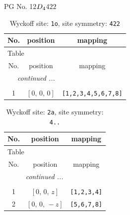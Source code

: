 \documentclass[fleqn,8pt]{jsarticle}
\begin{document}
\setcounter{MaxMatrixCols}{32}

\renewcommand{\tablename}{Table~}
\renewcommand{\figurename}{Figure~}
\begin{center}
\LARGE
PG No. 12\quad$D_{\rm 4}$\quad$422$\quad[ tetragonal ]
\end{center}
\renewcommand{\arraystretch}{1.2}
\begin{longtable}{ccc}
\caption{Wyckoff site: {\tt 1o}, site symmetry: {\tt 422}}
 \\
 \hline \hline
No. & position & mapping \\ \hline \endfirsthead

\multicolumn{2}{l}{\tablename\ \thetable{}} \\
 \hline \hline
No. & position & mapping \\ \hline \endhead

 \hline \hline
\multicolumn{2}{r}{\footnotesize\it continued ...} \\ \endfoot

 \hline \hline
\multicolumn{2}{r}{} \\ \endlastfoot

1 & $\left[ 0,\, 0,\, 0 \right]$ & {\tt [1,2,3,4,5,6,7,8]} \\
\end{longtable}
\renewcommand{\arraystretch}{1.2}
\begin{longtable}{ccc}
\caption{Wyckoff site: {\tt 2a}, site symmetry: {\tt 4..}}
 \\
 \hline \hline
No. & position & mapping \\ \hline \endfirsthead

\multicolumn{2}{l}{\tablename\ \thetable{}} \\
 \hline \hline
No. & position & mapping \\ \hline \endhead

 \hline \hline
\multicolumn{2}{r}{\footnotesize\it continued ...} \\ \endfoot

 \hline \hline
\multicolumn{2}{r}{} \\ \endlastfoot

1 & $\left[ 0,\, 0,\, z \right]$ & {\tt [1,2,3,4]} \\ \hline
2 & $\left[ 0,\, 0,\, - z \right]$ & {\tt [5,6,7,8]} \\
\end{longtable}
\renewcommand{\arraystretch}{1.2}
\end{document}
